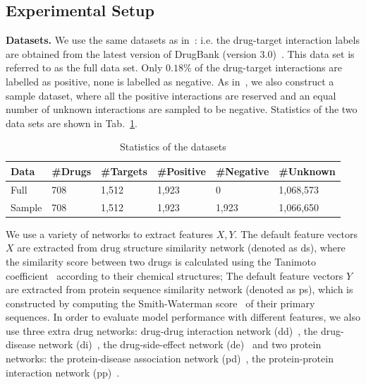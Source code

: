\documentclass[conference]{IEEEtran}
\begin{document}
\subsection{Experimental Setup}


\textbf{Datasets.} 
We use the same datasets as in~\cite{Luo2017Network}: i.e. the drug-target interaction labels are obtained from the latest version of DrugBank (version 3.0)~\cite{Knox2011DrugBank}. This data set is referred to as the full data set. Only $0.18\%$ of the drug-target interactions are labelled as positive, none is labelled as negative. As in~\cite{Luo2017Network}, we also construct a sample dataset, where all the positive interactions are reserved and an equal number of unknown interactions are sampled to be negative. Statistics of the two data sets are shown in Tab.~\ref{tab:data}. 
\begin{table}[htp]
\caption{Statistics of the datasets}\label{tab:data}
\center
\vspace*{-10pt}
\small
\begin{tabular}{|p{0.8cm}|p{0.8cm}|p{0.9cm}|p{1cm}|p{1.2cm}|p{1.2cm}|}
%
\hline
Data & \#Drugs & \#Targets & \#Positive & \#Negative & \#Unknown \\\hline
Full & 708 & 1,512 & 1,923 & 0 & 1,068,573 \\\hline
Sample & 708 & 1,512 & 1,923 & 1,923 & 1,066,650 \\\hline
\end{tabular}
\vspace*{-5pt}
\end{table}%

We use a variety of networks to extract features $X,Y$. The default feature vectors $X$ are extracted from drug structure similarity network (denoted as ds), where the similarity score between two drugs is calculated using the Tanimoto coefficient~\cite{Hattori2003Drug} according to their chemical structures; The default feature vectors $Y$ are extracted from protein sequence similarity network (denoted as ps), which is constructed by computing the Smith-Waterman score~\cite{Smith1981Protein} of their primary sequences. In order to evaluate model performance with different features, we also use three extra drug networks: drug-drug interaction network (dd)~\cite{Knox2011DrugBank}, the drug-disease network (di)~\cite{Davis2012DrugDisease}, the drug-side-effect network (de)~\cite{Kuhn2010DrugSideEffect} and two protein networks: the protein-disease association network (pd)~\cite{Davis2012DrugDisease}, the protein-protein interaction network (pp)~\cite{Keshava2009ProteinInteration}. 
\end{document}
